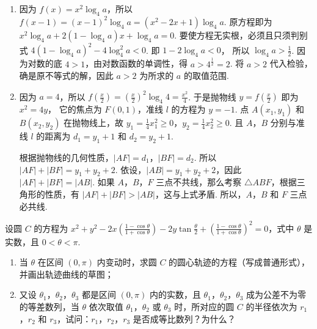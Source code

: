 \documentclass[UTF8,a4paper,oneside,11pt]{ctexbook}
\begin{document}
\begin{solution}
\begin{enumerate}
\item 因为 \(f(x)=x^2\log_4 a\)，所以
\(f(x-1)=\left( x-1 \right)^2\log_4 a=\left( x^2-2x+1 \right)\log_4 a\).
原方程即为
\(x^2\log_4 a+2\left( 1-\log_4 a \right)x+\log_4 a=0\).
要使方程无实根，必须且只须判别式
\(4\left( 1-\log_4 a \right)^2-4\log_4^2 a<0\).
即
\(1-2\log_4 a<0\)，
所以
\(\log_4 a>\frac{1}{2}\).
因为对数的底 \(4>1\)，由对数函数的单调性，得 \(a>4^{\frac{1}{2}}=2\). 将 \(a>2\) 代入检验，确是原不等式的解，因此 \(a>2\) 为所求的 \(a\) 的取值范围.

\item 因为 \(a=4\)，所以
\(f\left( \frac{x}{2} \right)=\left( \frac{x}{2} \right)^2\log_4 4=\frac{x^2}{4}\).
于是抛物线 \(y=f\left( \frac{x}{2} \right)\) 即为
\(x^2=4y\)，
它的焦点为 \(F(0,1)\)，准线 \(l\) 的方程为 \(y=-1\). 点 \(A(x_1,y_1)\) 和 \(B(x_2,y_2)\) 在抛物线上，故 \(y_1=\frac{1}{4}x_1^2\geqslant 0\)，\(y_2=\frac{1}{4}x_2^2\geqslant 0\). 且 \(A\)，\(B\) 分别与准线 \(l\) 的距离为 \(d_1=y_1+1\) 和 \(d_2=y_2+1\).


根据抛物线的几何性质，\(\left| AF \right|=d_1\)，\(\left| BF \right|=d_2\). 所以
\(\left| AF \right|+\left| BF \right|=y_1+y_2+2\).
依设，\(\left| AB \right|=y_1+y_2+2\)，因此
\(\left| AF \right|+\left| BF \right|=\left| AB \right|\).
如果 \(A\)，\(B\)，\(F\) 三点不共线，那么考察 \(\triangle ABF\)，根据三角形的性质，有 \(\left| AF \right|+\left| BF \right|>\left| AB \right|\)，这与上式矛盾. 所以，\(A\)，\(B\) 和 \(F\) 三点必共线.
\end{enumerate}
\end{solution}

\begin{problem}
设圆 \(C\) 的方程为 \(x^2+y^2-2x\left( \frac{1-\cos \theta}{1+\cos \theta} \right)-2y\tan \frac{\theta}{2}+\left( \frac{1-\cos \theta}{1+\cos \theta} \right)^2=0\)，式中 \(\theta\) 是实数，且 \(0<\theta<\pi\).

\begin{enumerate}
\item 当 \(\theta\) 在区间 \((0,\pi)\) 内变动时，求圆 \(C\) 的圆心轨迹的方程（写成普通形式），并画出轨迹曲线的草图；
\item 又设 \(\theta_1\)，\(\theta_2\)，\(\theta_3\) 都是区间 \((0,\pi)\) 内的实数，且 \(\theta_1\)，\(\theta_2\)，\(\theta_3\) 成为公差不为零的等差数列，当 \(\theta\) 依次取值 \(\theta_1\)，\(\theta_2\) 或 \(\theta_3\) 时，所对应的圆 \(C\) 的半径依次为 \(r_1\)，\(r_2\) 和 \(r_3\)，试问：\(r_1\)，\(r_2\)，\(r_3\) 是否成等比数列？为什么？
\end{enumerate}
\end{problem}
\end{document}
